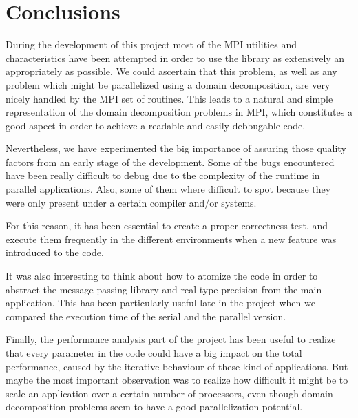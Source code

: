 \documentclass[12pt, a4paper, oneside]{article}
\begin{document}
\section{Conclusions}

During the development of this project most of the MPI utilities and characteristics have been attempted in order to use the library as extensively an appropriately as possible.
We could ascertain that this problem, as well as any problem which might be parallelized using a domain decomposition, are very nicely handled by the MPI set of routines.
This leads to a natural and simple representation of the domain decomposition problems in MPI, which constitutes a good aspect in order to achieve a readable and easily debbugable code.

Nevertheless, we have experimented the big importance of assuring those quality factors from an early stage of the development. Some of the bugs encountered have been really difficult to debug due to the complexity of the runtime in parallel applications. Also, some of them where difficult to spot because they were only present under a certain compiler and/or systems.

For this reason, it has been essential to create a proper correctness test, and execute them frequently in the different environments when a new feature was introduced to the code.

It was also interesting to think about how to atomize the code in order to abstract the message passing library and real type precision from the main application.
This has been particularly useful late in the project when we compared the execution time of the serial and the parallel version.

Finally, the performance analysis part of the project has been useful to realize that every parameter in the code could have a big impact on the total performance, caused by the iterative behaviour of these kind of applications.
But maybe the most important observation was to realize how difficult it might be to scale an application over a certain number of processors, even though domain decomposition problems seem to have a good parallelization potential.
\end{document}
